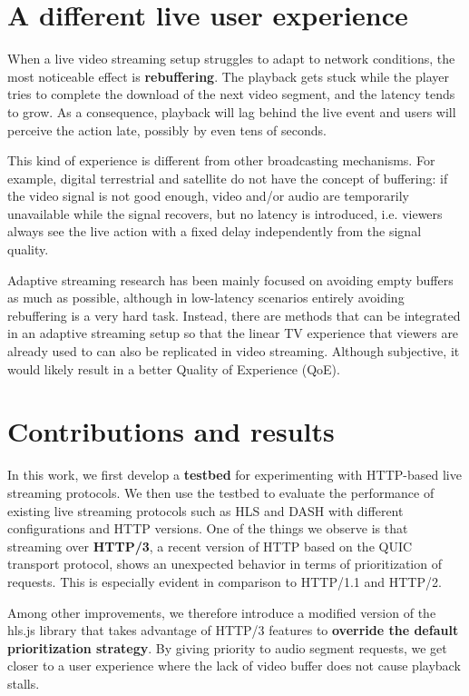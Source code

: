 \section{A different live user experience}
\label{sec:intro/experience}

When a live video streaming setup struggles to adapt to network conditions, the most noticeable effect is \textbf{rebuffering}. The playback gets stuck while the player tries to complete the download of the next video segment, and the latency tends to grow. As a consequence, playback will lag behind the live event and users will perceive the action late, possibly by even tens of seconds.

This kind of experience is different from other broadcasting mechanisms. For example, digital terrestrial and satellite do not have the concept of buffering: if the video signal is not good enough, video and/or audio are temporarily unavailable while the signal recovers, but no latency is introduced, i.e. viewers always see the live action with a fixed delay independently from the signal quality.

Adaptive streaming research has been mainly focused on avoiding empty buffers as much as possible, although in low-latency scenarios entirely avoiding rebuffering is a very hard task. Instead, there are methods that can be integrated in an adaptive streaming setup so that the linear TV experience that viewers are already used to can also be replicated in video streaming. Although subjective, it would likely result in a better Quality of Experience (QoE).

\section{Contributions and results}
\label{sec:intro/contributions}

In this work, we first develop a \textbf{testbed} for experimenting with HTTP-based live streaming protocols. We then use the testbed to evaluate the performance of existing live streaming protocols such as HLS and DASH with different configurations and HTTP versions. One of the things we observe is that streaming over \textbf{HTTP/3}, a recent version of HTTP based on the QUIC transport protocol, shows an unexpected behavior in terms of prioritization of requests. This is especially evident in comparison to HTTP/1.1 and HTTP/2.

Among other improvements, we therefore introduce a modified version of the hls.js library that takes advantage of HTTP/3 features to \textbf{override the default prioritization strategy}. By giving priority to audio segment requests, we get closer to a user experience where the lack of video buffer does not cause playback stalls.

